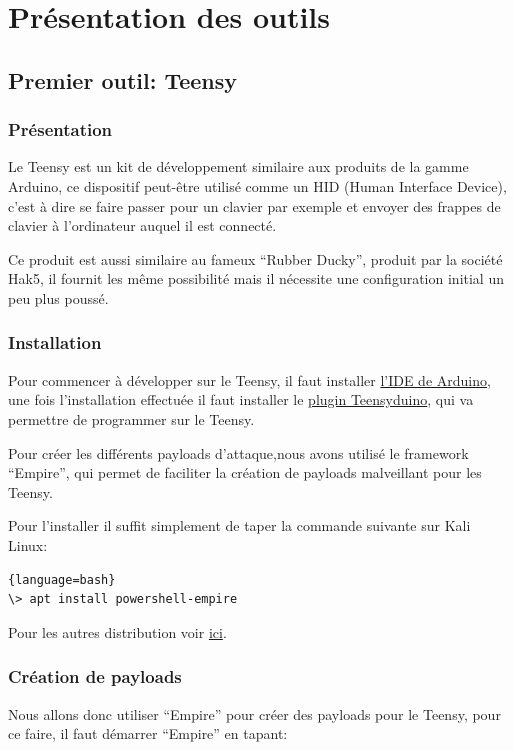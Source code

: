 \section{Présentation des outils}

\subsection{Premier outil: Teensy}

\subsubsection{Présentation}

Le Teensy est un kit de développement similaire aux produits de la gamme Arduino, 
ce dispositif peut-être utilisé comme un HID (Human Interface Device), 
c’est à dire se faire passer pour un clavier par exemple et envoyer des frappes de clavier à l’ordinateur 
auquel il est connecté.

Ce produit est aussi similaire au fameux “Rubber Ducky”, produit par la société Hak5, 
il fournit les même possibilité mais il nécessite une configuration initial un peu plus poussé.

\subsubsection{Installation}
Pour commencer à développer sur le Teensy, il faut installer \href{https://www.arduino.cc/en/main/software}{l’IDE de Arduino}, 
une fois l’installation effectuée il faut installer le \href{https://www.pjrc.com/teensy/teensyduino.html}{plugin Teensyduino}, qui va permettre de programmer sur le Teensy.

Pour créer les différents payloads d’attaque,nous avons utilisé le framework “Empire”, qui permet de faciliter 
la création de payloads malveillant pour les Teensy.

Pour l’installer il suffit simplement de taper la commande suivante sur Kali Linux:

\begin{lstlisting}{language=bash}
\> apt install powershell-empire
\end{lstlisting}

Pour les autres distribution voir \href{https://github.com/BC-SECURITY/Empire/tree/dev}{ici}. 

\subsubsection{Création de payloads}
Nous allons donc utiliser “Empire” pour créer des payloads pour le Teensy, pour ce faire, il faut démarrer “Empire” en tapant: 

